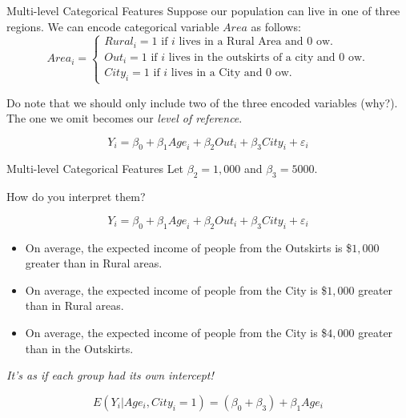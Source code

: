 \documentclass{clbeamer2024}
\begin{document}
\begin{frame}{Multi-level Categorical Features}
    Suppose our population can live in one of three regions. We can encode categorical variable $Area$ as follows:
    \begin{equation*}
        Area_i = \begin{cases}
            \textit{Rural}_i = 1 \text{ if $i$ lives in a Rural Area and $0$ ow.} \\
            \textit{Out}_i = 1 \text{ if $i$ lives in the outskirts of a city and $0$ ow.} \\
            \textit{City}_i = 1 \text{ if $i$ lives in a City and $0$ ow.}
        \end{cases}
    \end{equation*}

    Do note that we should only include two of the three encoded variables (why?). The one we omit becomes our \textit{level of reference}.
    
    \begin{equation*}
        Y_i = \beta_0 + \beta_1 \textit{Age}_i + \beta_2 \textit{Out}_i + \beta_3 \textit{City}_i + \varepsilon_i
    \end{equation*}
\end{frame}

\begin{frame}{Multi-level Categorical Features}
    Let $\beta_2 = 1,000$ and $\beta_3 = 5000$.

    How do you interpret them?

    \begin{equation*}
        Y_i = \beta_0 + \beta_1 \textit{Age}_i + \beta_2 \textit{Out}_i + \beta_3 \textit{City}_i + \varepsilon_i
    \end{equation*}
    
    \begin{itemize}
        \pause
        \item On average, the expected income of people from the Outskirts is \$$1,000$ greater than in Rural areas.
        \pause
        \item On average, the expected income of people from the City is \$$1,000$ greater than in Rural areas.
        \pause
        \item On average, the expected income of people from the City is \$$4,000$ greater than in the Outskirts.
    \end{itemize}

    \begin{center}
        \textit{It's as if each group had its own intercept!}
    \end{center}
    $$E(Y_i | Age_i, City_i = 1) = (\beta_0 + \beta_3) + \beta_1 Age_i$$
\end{frame}
\end{document}
